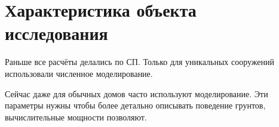 \chapter{Характеристика объекта исследования}
Раньше все расчёты делались по СП. Только для уникальных сооружений использовали численное моделирование.

Сейчас даже для обычных домов часто используют моделирование. Эти параметры нужны чтобы более детально описывать поведение грунтов, вычислительные мощности позволяют.